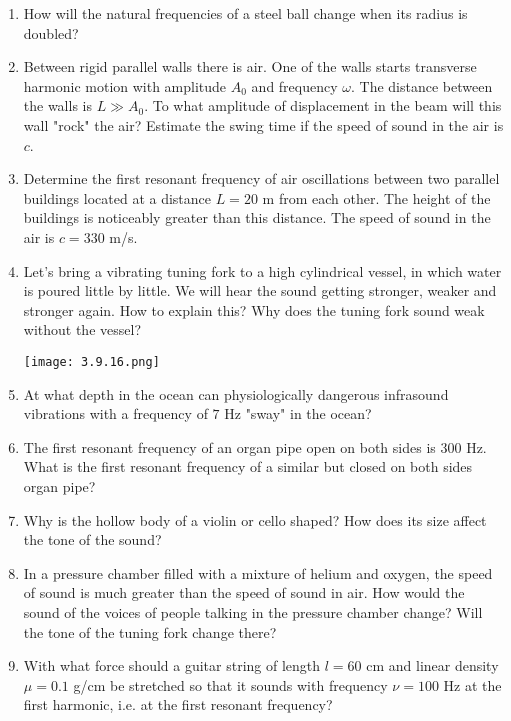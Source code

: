 \documentclass{article}
\begin{document}
\begin{enumerate}[label=3.9.\arabic*]
\item How will the natural frequencies of a steel ball change when its radius is doubled?

\item Between rigid parallel walls there is air. One of the walls starts transverse harmonic motion with amplitude $A_0$ and frequency $\omega$. The distance between the walls is $L \gg A_0$. To what amplitude of displacement in the beam will this wall "rock" the air? Estimate the swing time if the speed of sound in the air is $c$.

\item Determine the first resonant frequency of air oscillations between two parallel buildings located at a distance $L = 20$ m from each other. The height of the buildings is noticeably greater than this distance. The speed of sound in the air is $c = 330$ m/s. 

\item Let's bring a vibrating tuning fork to a high cylindrical vessel, in which water is poured little by little. We will hear the sound getting stronger, weaker and stronger again. How to explain this? Why does the tuning fork sound weak without the vessel?
\begin{center}

    \texttt{[image: 3.9.16.png]}
\end{center}

\item At what depth in the ocean can physiologically dangerous infrasound vibrations with a frequency of $7$ Hz "sway" in the ocean?

\item The first resonant frequency of an organ pipe open on both sides is $300$ Hz. What is the first resonant frequency of a similar but closed on both sides organ pipe?

\item Why is the hollow body of a violin or cello shaped? How does its size affect the tone of the sound?

\item In a pressure chamber filled with a mixture of helium and oxygen, the speed of sound is much greater than the speed of sound in air. How would the sound of the voices of people talking in the pressure chamber change? Will the tone of the tuning fork change there?

\item With what force should a guitar string of length $l = 60$ cm and linear density $\mu = 0.1$ g/cm be stretched so that it sounds with frequency $\nu = 100$ Hz at the first harmonic, i.e. at the first resonant frequency?


\end{enumerate}
\end{document}
